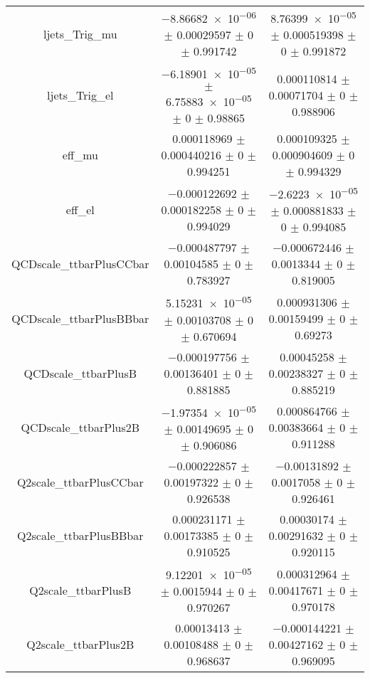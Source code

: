 \begin{table}
\begin{tabular}{ccc}
ljets\_Trig\_mu & \num{-8.86682e-06} $\pm$ \num{0.00029597} $\pm$ \num{0} $\pm$ \num{0.991742} & \num{8.76399e-05} $\pm$ \num{0.000519398} $\pm$ \num{0} $\pm$ \num{0.991872}\\
ljets\_Trig\_el & \num{-6.18901e-05} $\pm$ \num{6.75883e-05} $\pm$ \num{0} $\pm$ \num{0.98865} & \num{0.000110814} $\pm$ \num{0.00071704} $\pm$ \num{0} $\pm$ \num{0.988906}\\
eff\_mu & \num{0.000118969} $\pm$ \num{0.000440216} $\pm$ \num{0} $\pm$ \num{0.994251} & \num{0.000109325} $\pm$ \num{0.000904609} $\pm$ \num{0} $\pm$ \num{0.994329}\\
eff\_el & \num{-0.000122692} $\pm$ \num{0.000182258} $\pm$ \num{0} $\pm$ \num{0.994029} & \num{-2.6223e-05} $\pm$ \num{0.000881833} $\pm$ \num{0} $\pm$ \num{0.994085}\\
QCDscale\_ttbarPlusCCbar & \num{-0.000487797} $\pm$ \num{0.00104585} $\pm$ \num{0} $\pm$ \num{0.783927} & \num{-0.000672446} $\pm$ \num{0.0013344} $\pm$ \num{0} $\pm$ \num{0.819005}\\
QCDscale\_ttbarPlusBBbar & \num{5.15231e-05} $\pm$ \num{0.00103708} $\pm$ \num{0} $\pm$ \num{0.670694} & \num{0.000931306} $\pm$ \num{0.00159499} $\pm$ \num{0} $\pm$ \num{0.69273}\\
QCDscale\_ttbarPlusB & \num{-0.000197756} $\pm$ \num{0.00136401} $\pm$ \num{0} $\pm$ \num{0.881885} & \num{0.00045258} $\pm$ \num{0.00238327} $\pm$ \num{0} $\pm$ \num{0.885219}\\
QCDscale\_ttbarPlus2B & \num{-1.97354e-05} $\pm$ \num{0.00149695} $\pm$ \num{0} $\pm$ \num{0.906086} & \num{0.000864766} $\pm$ \num{0.00383664} $\pm$ \num{0} $\pm$ \num{0.911288}\\
Q2scale\_ttbarPlusCCbar & \num{-0.000222857} $\pm$ \num{0.00197322} $\pm$ \num{0} $\pm$ \num{0.926538} & \num{-0.00131892} $\pm$ \num{0.0017058} $\pm$ \num{0} $\pm$ \num{0.926461}\\
Q2scale\_ttbarPlusBBbar & \num{0.000231171} $\pm$ \num{0.00173385} $\pm$ \num{0} $\pm$ \num{0.910525} & \num{0.00030174} $\pm$ \num{0.00291632} $\pm$ \num{0} $\pm$ \num{0.920115}\\
Q2scale\_ttbarPlusB & \num{9.12201e-05} $\pm$ \num{0.0015944} $\pm$ \num{0} $\pm$ \num{0.970267} & \num{0.000312964} $\pm$ \num{0.00417671} $\pm$ \num{0} $\pm$ \num{0.970178}\\
Q2scale\_ttbarPlus2B & \num{0.00013413} $\pm$ \num{0.00108488} $\pm$ \num{0} $\pm$ \num{0.968637} & \num{-0.000144221} $\pm$ \num{0.00427162} $\pm$ \num{0} $\pm$ \num{0.969095}\\

\end{tabular}
\end{table}
